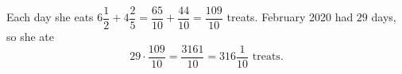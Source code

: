 Each day she eats $6\dfrac12+4\dfrac25=\dfrac{65}{10}+\dfrac{44}{10}=\dfrac{109}{10}$ treats. February 2020 had $29$ days, so she ate
\[29\cdot\dfrac{109}{10}=\dfrac{3161}{10}=\boxed{316\dfrac1{10}}\text{ treats}.\]
